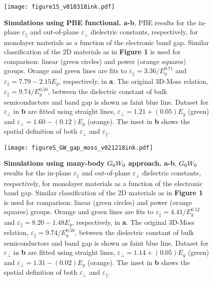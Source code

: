 \documentclass[journal=ancac3,manuscript=article,email=true,hyperref=true,keywords=true]{achemso}
\begin{document}
 

\begin{figure}[H]
\centering
\texttt{[image: figure1S\_v010318ink.pdf]}
\caption{\label{fig-S2}
{\bf Simulations using PBE functional. a-b}, PBE results for the in-plane $\varepsilon_{\parallel}$ and out-of-plane $\varepsilon_{\perp}$  
dielectric constants, respectively, for monolayer materials as a function of the electronic band gap. 
Similar classification of the 2D materials as in {\bf Figure 1}  
is used for comparison: linear (green circles) and power (orange squares) groups. 
Orange and green lines are fits 
to $\varepsilon_{\parallel}=3.36/E_{g}^{0.71}$ and 
$\varepsilon_{\parallel}=7.79-2.15E_{g}$, respectively, in {\bf a}. 
The original 3D-Moss relation, $\varepsilon_{\parallel}=9.74/E_{g}^{0.50}$, 
between the dielectric constant of bulk semiconductors and band gap 
is shown as faint blue line.  
Dataset for $\varepsilon_{\perp}$ in {\bf b} are fitted using straight lines, 
$\varepsilon_{\perp}=1.21+(0.05)E_{g}$ (green) and $\varepsilon_{\perp}=1.60-(0.12)E_{g}$ (orange). 
The inset in {\bf b} shows the spatial definition of both $\varepsilon_{\perp}$ and $\varepsilon_{\parallel}$. 
}
\end{figure}

\begin{figure}[H]
\centering
\texttt{[image: figureS\_GW\_gap\_moss\_v021218ink.pdf]}
\caption{\label{fig-S3}
{\bf Simulations using many-body $G_{\rm 0}W_{\rm 0}$ approach. a-b}, $G_{\rm 0}W_{\rm 0}$ results for the in-plane $\varepsilon_{\parallel}$ and out-of-plane $\varepsilon_{\perp}$  
dielectric constants, respectively, for monolayer materials as a function of the electronic band gap. 
Similar classification of the 2D materials as in {\bf Figure 1}
is used for comparison: linear (green circles) and power (orange squares) groups. 
Orange and green lines are fits 
to $\varepsilon_{\parallel}=4.41/E_{g}^{0.52}$ and 
$\varepsilon_{\parallel}=8.20-1.48E_{g}$, respectively, in {\bf a}. 
The original 3D-Moss relation, $\varepsilon_{\parallel}=9.74/E_{g}^{0.50}$, 
between the dielectric constant of bulk semiconductors and band gap 
is shown as faint blue line.  
Dataset for $\varepsilon_{\perp}$ in {\bf b} are fitted using straight lines, 
$\varepsilon_{\perp}=1.14+(0.05)E_{g}$ (green) and $\varepsilon_{\perp}=1.31-(0.02)E_{g}$ (orange). 
The inset in {\bf b} shows the spatial definition of both $\varepsilon_{\perp}$ and $\varepsilon_{\parallel}$. 
}
\end{figure}
\end{document}
